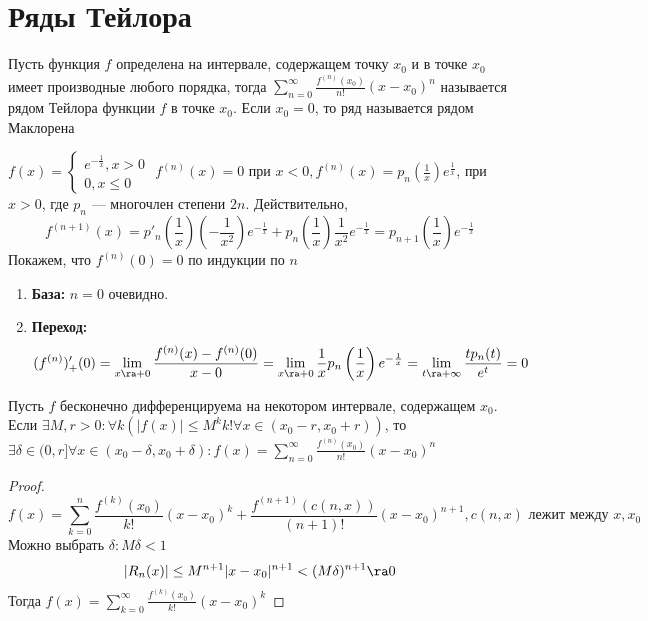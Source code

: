 \section{Ряды Тейлора}
\begin{definition}
    Пусть функция \(f\) определена на интервале, содержащем точку \(x_0\) и в точке \(x_0\) имеет производные любого порядка, тогда \(\sum_{n = 0}^\infty \frac{f^{(n)}(x_0)}{n!}(x - x_0)^n\) называется рядом Тейлора функции \(f\) в точке \(x_0\). Если \(x_0 = 0\), то ряд называется рядом Маклорена
\end{definition}
\begin{example}
    \(f(x) = \left\{\begin{array}{l}
        e^{-\frac{1}{x}}, x > 0 \\
        0, x \le 0
    \end{array}\right.\)
    \(f^{(n)}(x) = 0\) при \(x < 0, f^{(n)}(x) = p_n\left(\frac{1}{x}\right)e^\frac{1}{x}\), при \(x > 0\), где \(p_n\) --- многочлен степени \(2n\). Действительно,
    \[f^{(n + 1)}(x) = p'_{n}\left(\frac{1}{x}\right)\left(-\frac{1}{x^2}\right)e^{-\frac{1}{x}} + p_{n}\left(\frac{1}{x}\right)\frac{1}{x^2}e^{-\frac{1}{x}} = p_{n + 1}\left(\frac{1}{x}\right) e^{-\frac{1}{x}}\]
    Покажем, что \(f^{(n)}(0) = 0\) по индукции по \(n\)
    \begin{enumerate}
        \item[] \textbf{База:} \(n = 0\) очевидно.
        \item[] \textbf{Переход:} 
        \[(f^{(n)})_+'(0) = \lim_{x \ra +0} \frac{f^{(n)}(x) - f^{(n)}(0)}{x - 0} = \lim_{x \ra +0} \frac{1}{x}p_n\left(\frac{1}{x}\right)e^{-\frac{1}{x}} = \lim_{t \ra +\infty} \frac{tp_n(t)}{e^t} = 0\]
    \end{enumerate}
\end{example}

\begin{lemma}
    Пусть \(f\) бесконечно дифференцируема на некотором интервале, содержащем \(x_0\). Если \(\exists M, r > 0: \forall k (|f(x)| \le M^kk! \forall x \in (x_0 - r, x_0 + r))\), то \(\exists \delta \in (0, r] \forall x \in (x_0 - \delta, x_0 + \delta): f(x) = \sum_{n = 0}^\infty \frac{f^{(n)}(x_0)}{n!}(x - x_0)^n\)
\end{lemma}
\begin{proof}
    \[f(x) = \sum_{k = 0}^n \frac{f^{(k)}(x_0)}{k!}(x - x_0)^k + \frac{f^{(n + 1)}(c(n, x))}{(n + 1)!}(x - x_0)^{n + 1}, c(n, x) \text{ лежит между }x, x_0\]
    Можно выбрать \(\delta: M\delta < 1\)
    \[|R_n(x)| \le M^{n + 1}|x - x_0|^{n + 1} < (M\delta)^{n + 1} \ra 0\]
    Тогда \(f(x) = \sum_{k = 0}^\infty \frac{f^{(k)}(x_0)}{k!}(x - x_0)^k\)
\end{proof}